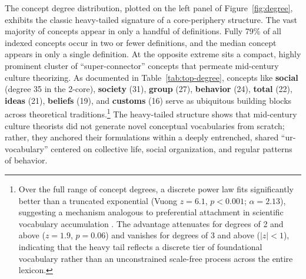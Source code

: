 \documentclass[11pt]{article}
\begin{document}
The concept degree distribution, plotted on the left panel of Figure~\ref{fig:degree}, exhibits the classic heavy-tailed signature of a core-periphery structure. The vast majority of concepts appear in only a handful of definitions. Fully 79\% of all indexed concepts occur in two or fewer definitions, and the median concept appears in only a single definition. At the opposite extreme sits a compact, highly prominent cluster of ``super-connector'' concepts that permeate mid-century culture theorizing. As documented in Table~\ref{tab:top-degree}, concepts like \textbf{social} (degree 35 in the 2-core), \textbf{society} (31), \textbf{group} (27), \textbf{behavior} (24), \textbf{total} (22), \textbf{ideas} (21), \textbf{beliefs} (19), and \textbf{customs} (16) serve as ubiquitous building blocks across theoretical traditions.\footnote{Over the full range of concept degrees, a discrete power law fits significantly better than a truncated exponential (Vuong $z = 6.1$, $p < 0.001$; $\hat{\alpha} = 2.13$), suggesting a mechanism analogous to preferential attachment in scientific vocabulary accumulation \citep{barabási1999emergence-913}. The advantage attenuates for degrees of 2 and above ($z = 1.9$, $p = 0.06$) and vanishes for degrees of 3 and above ($|z| < 1$), indicating that the heavy tail reflects a discrete tier of foundational vocabulary rather than an unconstrained scale-free process across the entire lexicon.} The heavy-tailed structure shows that mid-century culture theorists did not generate novel conceptual vocabularies from scratch; rather, they anchored their formulations within a deeply entrenched, shared ``ur-vocabulary'' centered on collective life, social organization, and regular patterns of behavior.
\end{document}
